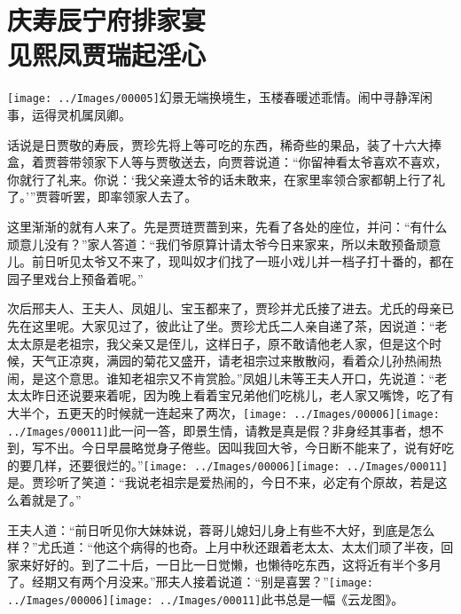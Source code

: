

\chapter{庆寿辰宁府排家宴\\见熙凤贾瑞起淫心}\label{part0015_split_000.htmlux5cux23calibre_pb_0}

{\texttt{[image: ../Images/00005]}幻景无端换境生，玉楼春暖述乖情。闹中寻静浑闲事，运得灵机属凤卿。}

话说是日贾敬的寿辰，贾珍先将上等可吃的东西，稀奇些的果品，装了十六大捧盒，着贾蓉带领家下人等与贾敬送去，向贾蓉说道：``你留神看太爷喜欢不喜欢，你就行了礼来。你说：`我父亲遵太爷的话未敢来，在家里率领合家都朝上行了礼了。'''贾蓉听罢，即率领家人去了。

这里渐渐的就有人来了。先是贾琏贾蔷到来，先看了各处的座位，并问：``有什么顽意儿没有？''家人答道：``我们爷原算计请太爷今日来家来，所以未敢预备顽意儿。前日听见太爷又不来了，现叫奴才们找了一班小戏儿并一档子打十番的，都在园子里戏台上预备着呢。''

次后邢夫人、王夫人、凤姐儿、宝玉都来了，贾珍并尤氏接了进去。尤氏的母亲已先在这里呢。大家见过了，彼此让了坐。贾珍尤氏二人亲自递了茶，因说道：``老太太原是老祖宗，我父亲又是侄儿，这样日子，原不敢请他老人家，但是这个时候，天气正凉爽，满园的菊花又盛开，请老祖宗过来散散闷，看着众儿孙热闹热闹，是这个意思。谁知老祖宗又不肯赏脸。''凤姐儿未等王夫人开口，先说道：``老太太昨日还说要来着呢，因为晚上看着宝兄弟他们吃桃儿，老人家又嘴馋，吃了有大半个，五更天的时候就一连起来了两次，{\texttt{[image: ../Images/00006]}\texttt{[image: ../Images/00011]}\footnotesize \kaishu 此一问一答，即景生情，请教是真是假？非身经其事者，想不到，写不出。}今日早晨略觉身子倦些。因叫我回大爷，今日断不能来了，说有好吃的要几样，还要很烂的。''{\texttt{[image: ../Images/00006]}\texttt{[image: ../Images/00011]}\footnotesize \kaishu 是。}贾珍听了笑道：``我说老祖宗是爱热闹的，今日不来，必定有个原故，若是这么着就是了。''

王夫人道：``前日听见你大妹妹说，蓉哥儿媳妇儿身上有些不大好，到底是怎么样？''尤氏道：``他这个病得的也奇。上月中秋还跟着老太太、太太们顽了半夜，回家来好好的。到了二十后，一日比一日觉懒，也懒待吃东西，这将近有半个多月了。经期又有两个月没来。''邢夫人接着说道：``别是喜罢？''{\texttt{[image: ../Images/00006]}\texttt{[image: ../Images/00011]}\footnotesize \kaishu 此书总是一幅《云龙图》。}

